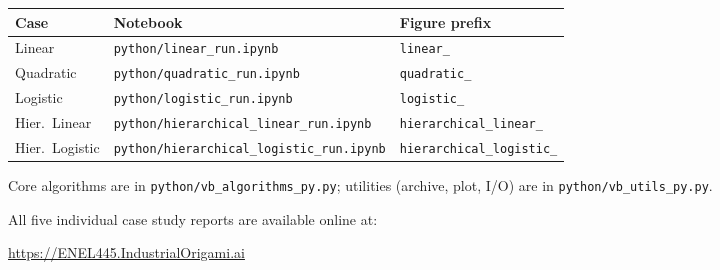 \documentclass[11pt,a4paper]{article}
\begin{document}
\begin{center}
\begin{tabular}{@{}lll@{}}
\toprule
Case & Notebook & Figure prefix \\
\midrule
Linear          & \texttt{python/linear\_run.ipynb}                  & \texttt{linear\_} \\
Quadratic       & \texttt{python/quadratic\_run.ipynb}               & \texttt{quadratic\_} \\
Logistic        & \texttt{python/logistic\_run.ipynb}                & \texttt{logistic\_} \\
Hier.~Linear    & \texttt{python/hierarchical\_linear\_run.ipynb}    & \texttt{hierarchical\_linear\_} \\
Hier.~Logistic  & \texttt{python/hierarchical\_logistic\_run.ipynb}  & \texttt{hierarchical\_logistic\_} \\
\bottomrule
\end{tabular}
\end{center}

Core algorithms are in \texttt{python/vb\_algorithms\_py.py};
utilities (archive, plot, I/O) are in \texttt{python/vb\_utils\_py.py}.

All five individual case study reports are available online at:
\begin{center}
  \url{https://ENEL445.IndustrialOrigami.ai}
\end{center}
\end{document}
